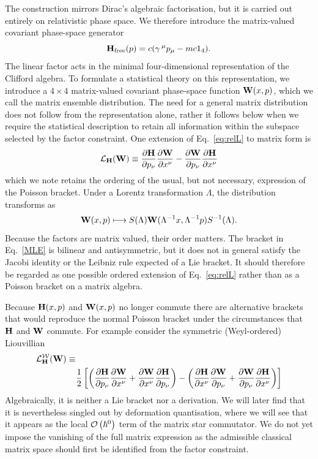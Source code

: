 \documentclass[final,5p,times,twocolumn]{elsarticle}
\begin{document}
The construction mirrors Dirac's algebraic factorisation, but it is carried out entirely on relativistic phase space. 
We therefore introduce the matrix-valued covariant phase-space generator
\begin{equation}
  \mathbf{H}_{\mathrm{free}}(p)
  =c(\gamma\,^\mu p_\mu-mc 1_4).
  \label{eq:matrix-generator}
\end{equation}
The linear factor acts in the minimal four-dimensional representation of the Clifford algebra. 
To formulate a statistical theory on this representation, we introduce a $4\times4$ matrix-valued covariant phase-space function $\mathbf{W}(x,p)$, which we call the matrix ensemble distribution. 
The need for a general matrix distribution does not follow from the representation alone, rather it follows below when we require the statistical description to retain all information within the subspace selected by the factor constraint.
One extension of Eq.~\eqref{eq:relL} to matrix form is
\begin{equation}
  \mathcal{L}_{\uH}(\uW)
  \equiv
  \PD{\uH}{p_\nu}
  \PD{\uW}{x^\nu}
  -
  \PD{\uW}{p_\nu}
  \PD{\uH}{x^\nu}
  \label{MLE}
\end{equation}
which we note retains the ordering of the usual, but not necessary, expression of the Poisson bracket.
Under a Lorentz transformation $\Lambda$, the distribution transforms
as
\begin{equation}
  \mathbf{W}(x,p)\longmapsto
  S(\Lambda)
  \mathbf{W}(\Lambda^{-1}x,\Lambda^{-1}p)
  S^{-1}(\Lambda).
\end{equation}
Because the factors are matrix valued, their order matters. The bracket in Eq.~\eqref{MLE} is bilinear and antisymmetric, but it does not in general satisfy the Jacobi identity or the Leibniz rule expected of a Lie bracket. 
It should therefore be regarded as one possible ordered extension of Eq.~\eqref{eq:relL} rather than as a Poisson bracket on a matrix algebra.

Because $\mathbf{H}(x,p)$ and $\mathbf{W}(x,p)$ no longer commute there are alternative brackets that would reproduce the normal Poisson bracket under the circumstances that $\mathbf{H}$ and $\mathbf{W}$ commute. 
For example consider the symmetric (Weyl-ordered) Liouvillian  
\begin{align}
    &
    \mathcal{L}^{\mathcal{W}}_\uH(\uW) \equiv
   \label{extendedbracket} 
   \\  & \ \ \ \ \ \ \ \ \ \ \ \ \ \ 
    \nonumber
    \frac{1}{2}
    \left[
    \left(
	\PD{\uH}{p_\nu}
	\PD{\uW}{x^\nu}
	+
	\PD{\uW}{x^\nu}
	\PD{\uH}{p_\nu}
	\right)
    -
	\left(
	\PD{\uH}{x^\nu}
	\PD{\uW}{p_\nu}
	+
	\PD{\uW}{p_\nu}
	\PD{\uH}{x^\nu}
	\right)
    \right]
\end{align}
Algebraically, it is neither a Lie bracket nor a derivation. We will later find that it is nevertheless singled out by deformation quantisation, where we will see that it appears as the local $\mathcal{O}\left(\hbar^0 \right)$ term of the matrix star commutator. 
We do not yet impose the vanishing of the full matrix expression as the admissible classical matrix space should first be identified from the factor constraint.
\end{document}
